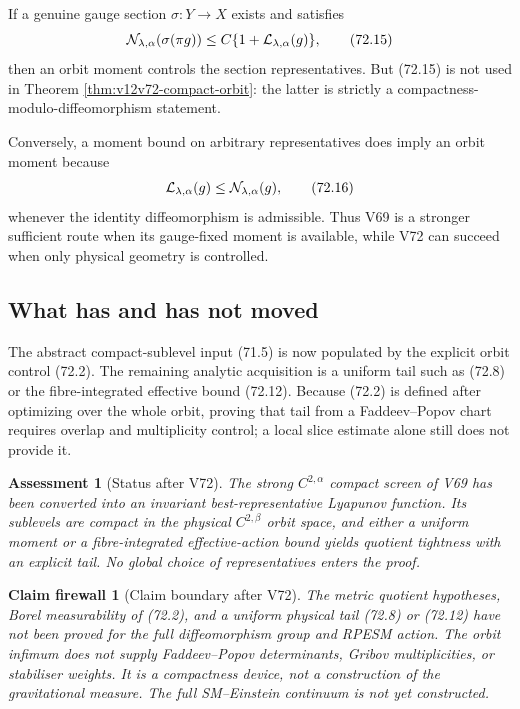 \documentclass[11pt]{article}
\newtheorem{firewall}[theorem]{Claim firewall}
\newtheorem{assessment}[theorem]{Assessment}
\theoremstyle{remark}
\begin{document}
If a genuine gauge section
\(\sigma:Y\to X\) exists and satisfies
\[
 {\cal N}_{\lambda,\alpha}(\sigma(\pi g))
 \leq C\{1+{\cal L}_{\lambda,\alpha}(g)\},                   \tag{72.15}
\]
then an orbit moment controls the section representatives.  But
(72.15) is not used in Theorem
\ref{thm:v12v72-compact-orbit}: the latter is strictly a
compactness-modulo-diffeomorphism statement.

Conversely, a moment bound on arbitrary representatives does imply
an orbit moment because
\[
 {\cal L}_{\lambda,\alpha}(g)
 \leq{\cal N}_{\lambda,\alpha}(g),                           \tag{72.16}
\]
whenever the identity diffeomorphism is admissible.  Thus V69 is a
stronger sufficient route when its gauge-fixed moment is available,
while V72 can succeed when only physical geometry is controlled.

\subsection{What has and has not moved}

The abstract compact-sublevel input (71.5) is now populated by the
explicit orbit control (72.2).  The remaining analytic acquisition
is a uniform tail such as (72.8) or the fibre-integrated effective
bound (72.12).  Because (72.2) is defined after optimizing over the
whole orbit, proving that tail from a Faddeev--Popov chart requires
overlap and multiplicity control; a local slice estimate alone still
does not provide it.

\begin{assessment}[Status after V72]
\label{ass:v12v72-status}
The strong \(C^{2,\alpha}\) compact screen of V69 has been converted
into an invariant best-representative Lyapunov function.  Its
sublevels are compact in the physical \(C^{2,\beta}\) orbit space,
and either a uniform moment or a fibre-integrated effective-action
bound yields quotient tightness with an explicit tail.  No global
choice of representatives enters the proof.
\end{assessment}

\begin{firewall}[Claim boundary after V72]
\label{fire:v12v72-claim}
The metric quotient hypotheses, Borel measurability of (72.2), and a
uniform physical tail (72.8) or (72.12) have not been proved for the
full diffeomorphism group and RPESM action.  The orbit infimum does
not supply Faddeev--Popov determinants, Gribov multiplicities, or
stabiliser weights.  It is a compactness device, not a construction
of the gravitational measure.  The full SM--Einstein continuum is
not yet constructed.
\end{firewall}
\end{document}
